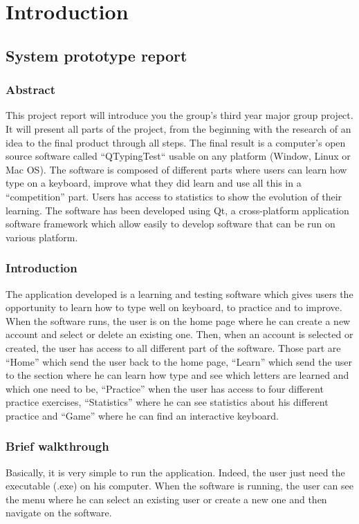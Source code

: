 \part{Introduction}

\chapter{System prototype report}

\section{Abstract}
This project report will introduce you the group's third year major group project. It will present all parts of the project, from the beginning with the research of an idea to the final product through all steps. The final result is a computer's open source software called “QTypingTest“ usable on any platform (Window, Linux or Mac OS). The software is composed of different parts where users can learn how type on a keyboard, improve what they did learn and use all this in a “competition” part. Users has access to statistics to show the evolution of their learning. The software has been developed using Qt, a cross-platform application software framework which allow easily to develop software that can be run on various platform. 

\section{Introduction}
The application developed is a learning and testing software which gives users the opportunity to learn how to type well on keyboard, to practice and to improve. When the software runs, the user is on the home page where he can create a new account and select or delete an existing one. Then, when an account is selected or created, the user has access to all different part of the software. Those part are “Home” which send the user back to the home page, “Learn” which send the user to the section where he can learn how type and see which letters are learned and which one need to be, “Practice” when the user has access to four different practice exercises, “Statistics” where he can see statistics about his different practice and “Game” where he can find an interactive keyboard. 

\section{Brief walkthrough}
Basically, it is very simple to run the application. Indeed, the user just need the executable (.exe) on his computer. When the software is running, the user can see the menu where he can select an existing user or create a new one and then navigate on the software. 

